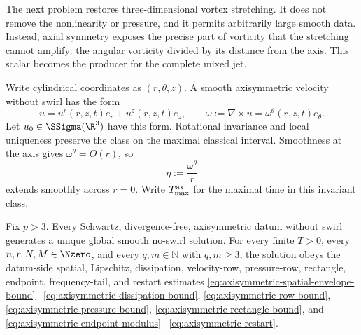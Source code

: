 The next problem restores three-dimensional vortex stretching.  It does not
remove the nonlinearity or pressure, and it permits arbitrarily large smooth
data.  Instead, axial symmetry exposes the precise part of vorticity that the
stretching cannot amplify: the angular vorticity divided by its distance from
the axis.  This scalar becomes the producer for the complete mixed jet.

Write cylindrical coordinates as \((r,\theta,z)\).  A smooth axisymmetric
velocity without swirl has the form
\begin{equation}
 u=u^r(r,z,t)e_r+u^z(r,z,t)e_z,
 \qquad
 \omega:=\nabla\times u=\omega^\theta(r,z,t)e_\theta.
 \label{eq:axisymmetric-form}
\end{equation}
Let \(u_0\in\SSigma(\R^3)\) have this form.  Rotational invariance and local
uniqueness preserve the class on the maximal classical interval.  Smoothness
at the axis gives \(\omega^\theta=O(r)\), so
\begin{equation}
\eta:=\frac{\omega^\theta}{r}
\label{eq:axisymmetric-relative-vorticity}
\end{equation}
extends smoothly across \(r=0\).
Write \(T_{\max}^{\rm axi}\) for the maximal time in this invariant class.

\begin{theorem}
\label{thm:quantitative-axisymmetric-jet}
Fix \(p>3\).  Every Schwartz, divergence-free, axisymmetric datum without
swirl generates a unique global smooth no-swirl solution.  For every finite
\(T>0\), every \(n,r,N,M\in\Nzero\), and every
\(q,m\in\mathbb N\) with \(q,m\ge3\), the solution
obeys the datum-side
spatial, Lipschitz, dissipation, velocity-row, pressure-row, rectangle,
endpoint, frequency-tail, and restart estimates
\eqref{eq:axisymmetric-spatial-envelope-bound}--
\eqref{eq:axisymmetric-dissipation-bound},
\eqref{eq:axisymmetric-row-bound},
\eqref{eq:axisymmetric-pressure-bound},
\eqref{eq:axisymmetric-rectangle-bound}, and
\eqref{eq:axisymmetric-endpoint-modulus}--
\eqref{eq:axisymmetric-restart}.
\end{theorem}

